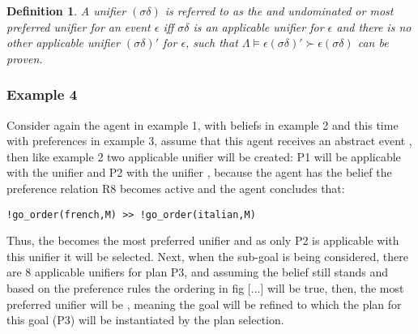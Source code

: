 \documentclass[sigconf,anonymous]{aamas}
\newtheorem{definition}{Definition}
\begin{document}
\begin{definition}
A unifier $(\sigma\delta)$ is referred to as the and \textit{undominated} or \textit{most preferred} unifier for an event $\epsilon$ iff $\sigma\delta$ is an applicable unifier for $\epsilon$ and there is no other applicable unifier $(\sigma\delta)'$ for $\epsilon$, such that $\Lambda \models \epsilon(\sigma\delta)' \succ \epsilon(\sigma\delta)$ can be proven.
\end{definition}


\subsubsection{Example 4}
Consider again the agent in example 1, with beliefs in example 2 and this time with preferences in example 3, assume that this agent receives an abstract event , then like example 2 two applicable unifier will be created: P1 will be applicable with the unifier  and P2 with the unifier , because the agent has the belief  the preference relation R8 becomes active and the agent concludes that:
\begin{verbatim}
!go_order(french,M) >> !go_order(italian,M)
\end{verbatim}
Thus, the  becomes the most preferred unifier and as only P2 is applicable with this unifier it will be selected. Next, when the sub-goal  is being considered, there are 8 applicable unifiers for plan P3, and assuming the  belief still stands and based on the preference rules the ordering in fig [...] will be true, then, the most preferred unifier will be , meaning the goal will be refined to  which the plan for this goal (P3) will be instantiated by the plan selection.
\end{document}
